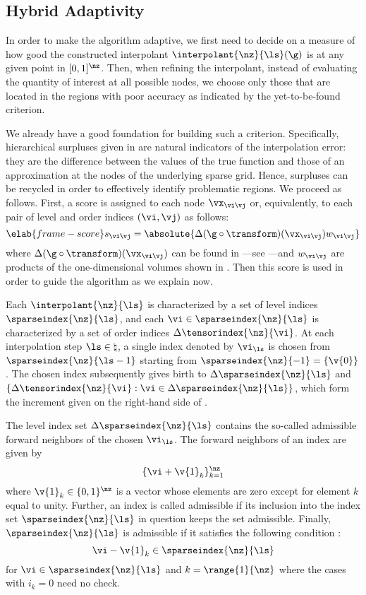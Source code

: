 \subsection{Hybrid Adaptivity}

In order to make the algorithm adaptive, we first need to decide on a measure of
how good the constructed interpolant $\interpolant{\nz}{\ls}(\g)$ is at any
given point in $[0, 1]^\nz$. Then, when refining the interpolant, instead of
evaluating the quantity of interest at all possible nodes, we choose only those
that are located in the regions with poor accuracy as indicated by the
yet-to-be-found criterion.

We already have a good foundation for building such a criterion. Specifically,
hierarchical surpluses given in  are natural
indicators of the interpolation error: they are the difference between the
values of the true function and those of an approximation at the nodes of the
underlying sparse grid. Hence, surpluses can be recycled in order to effectively
identify problematic regions. We proceed as follows. First, a score is assigned
to each node $\vx_{\vi \vj}$ or, equivalently, to each pair of level and order
indices $(\vi, \vj)$ as follows:
\begin{equation} \elab{frame-score}
  s_{\vi \vj} = \absolute{\Delta(\g \circ \transform)(\vx_{\vi \vj}) w_{\vi \vj}}
\end{equation}
where $\Delta(\g \circ \transform)(\vx_{\vi \vj})$ can be found in
---see ---and
$w_{\vi \vj}$ are products of the one-dimensional volumes shown in
. Then this score is used in order to guide the
algorithm as we explain now.

Each $\interpolant{\nz}{\ls}$ is characterized by a set of level indices
$\sparseindex{\nz}{\ls}$, and each $\vi \in \sparseindex{\nz}{\ls}$ is
characterized by a set of order indices $\Delta\tensorindex{\nz}{\vi}$. At each
interpolation step $\ls \in \natural$, a single index denoted by $\vi_{\ls}$ is
chosen from $\sparseindex{\nz}{\ls - 1}$ starting from $\sparseindex{\nz}{-1} =
\{ \v{0} \}$. The chosen index subsequently gives birth to
$\Delta\sparseindex{\nz}{\ls}$ and $\{ \Delta\tensorindex{\nz}{\vi}: \vi \in
\Delta\sparseindex{\nz}{\ls} \}$, which form the increment given on the
right-hand side of .

The level index set $\Delta\sparseindex{\nz}{\ls}$ contains the so-called
admissible forward neighbors of the chosen $\vi_{\ls}$. The forward neighbors of
an index \vi are given by
\[
  \{ \vi + \v{1}_k \}_{k = 1}^\nz
\]
where $\v{1}_k \in \{ 0, 1 \}^\nz$ is a vector whose elements are zero except
for element $k$ equal to unity. Further, an index \vi is called admissible if
its inclusion into the index set $\sparseindex{\nz}{\ls}$ in question keeps the
set admissible. Finally, $\sparseindex{\nz}{\ls}$ is admissible if it satisfies
the following condition \cite{klimke2006}:
\[
  \vi - \v{1}_k \in \sparseindex{\nz}{\ls}
\]
for $\vi \in \sparseindex{\nz}{\ls}$ and $k = \range{1}{\nz}$ where the cases
with $i_k = 0$ need no check.

